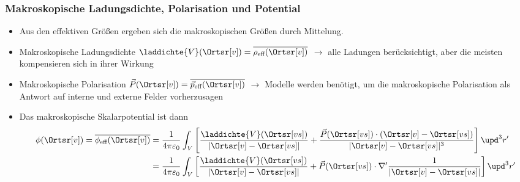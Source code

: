 \begin{frame}

  \frametitle{Makroskopische Ladungsdichte, Polarisation und Potential}
  \begin{itemize}[<+->]
  \item Aus den effektiven Größen ergeben sich die \alert{makroskopischen} Größen durch Mittelung.
  \item \alert{Makroskopische Ladungsdichte} $\laddichte{V}(\Ortsr[v]) = \overline{\rho_{\text{eff}}(\Ortsr[v])} $ $\to$ alle Ladungen berücksichtigt, aber die meisten kompensieren sich in ihrer Wirkung
  \item \alert{Makroskopische Polarisation} $\vec{P}(\Ortsr[v]) = \overline{\vec{p}_{\text{eff}}(\Ortsr[v])} $ $\to$ \alert{Modelle} werden benötigt, um die makroskopische Polarisation als Antwort auf interne und externe Felder vorherzusagen 
  \item Das \alert{makroskopische Skalarpotential} ist dann
    \begin{align*}
      \phi (\Ortsr[v]) = \overline{\phi _{\text{eff}}(\Ortsr[v])} &= \frac{1}{4\pi\varepsilon_0} \int_V \left[ \frac{\laddichte{V}(\Ortsr[vs])}{|\Ortsr[v] - \Ortsr[vs] |} + \frac{\vec{P}(\Ortsr[vs])  \cdot (\Ortsr[v] - \Ortsr[vs] )}{|\Ortsr[v] - \Ortsr[vs] |^3} \right] \upd^3 r' \\
      &= \frac{1}{4\pi\varepsilon_0} \int_V \left[ \frac{\laddichte{V}(\Ortsr[vs])}{|\Ortsr[v] - \Ortsr[vs] |} + \vec{P}(\Ortsr[vs])  \cdot \nabla' \frac{1}{|\Ortsr[v] - \Ortsr[vs] |} \right] \upd^3 r'
      \end{align*}
\end{itemize}
  
  \end{frame}


